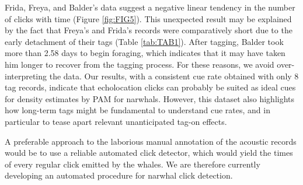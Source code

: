 \documentclass[preprint]{JASA}
\begin{document}
Frida, Freya, and Balder’s data suggest a negative linear tendency in the number of clicks with time (Figure  \ref{fig:FIG5}). This unexpected result may be explained by the fact that Freya’s and Frida’s records were comparatively short due to the early detachment of their tags (Table \ref{tab:TAB1}). After tagging, Balder took more than 2.58 days to begin foraging, which indicates that it may have taken him longer to recover from the tagging process. For these reasons, we avoid over-interpreting the data. Our results, with a consistent cue rate obtained with only 8 tag records, indicate that echolocation clicks can probably be suited as ideal cues for density estimates by PAM for narwhals. However, this dataset also highlights how long-term tags might be fundamental to understand cue rates, and in particular to tease apart relevant unanticipated tag-on effects.

A preferable approach to the laborious manual annotation of the acoustic records would be to use a reliable automated click detector, which would yield the times of every regular click emitted by the whales.  We are therefore currently developing an automated procedure for narwhal click detection. 
\end{document}
